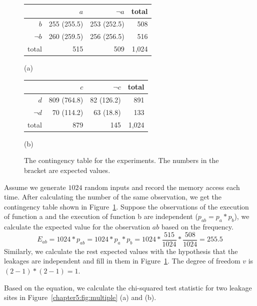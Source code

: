 \begin{figure}[h]
  \begin{minipage}{0.45\linewidth}
      \begin{tabular}{rrrr}
        \toprule
        & $a$ & $\lnot a$  & total\\
        \midrule
        $b$   & 255 (255.5) & 253 (252.5) &   508  \\
        $\lnot b$   & 260 (259.5)  & 256 (256.5) &    516   \\
        total &   515 &  509   & 1,024   \\
        \bottomrule
      \end{tabular}\caption*{(a)}
  \end{minipage}
\hfill
  \begin{minipage}{0.45\linewidth}
      \begin{tabular}{rrrr}
        \toprule
        & $c$ & $\lnot c$  & total\\
        \midrule
        $d$   & 809 (764.8) & 82 (126.2) & 891    \\
        $\lnot d$   & 70 (114.2)  & 63 (18.8)&  133     \\
        total &  879 &  145  & 1,024    \\
        \bottomrule
      \end{tabular}\caption*{(b)}
  \end{minipage}
  \caption{The contingency table for the experiments. The numbers in the bracket are expected values. }\label{chapter5:fig:con_table}
\end{figure}


Assume we generate $1024$ random inputs and record the memory access each time.  After calculating the number of the same observation, we get the contingency table shown in Figure~\ref{chapter5:fig:con_table}. Suppose the observations of the execution of function \textsf{a} and the execution of function \textsf{b} are independent ($p_{ab} = p_a*p_b$),  we calculate the expected value for the observation $ab$ based on the frequency.
\[ E_{ab} = 1024*p_{ab} = 1024*p_a*p_b = 1024*\frac{515}{1024}*\frac{508}{1024} = 255.5\]
Similarly, we calculate the rest expected values with the hypothesis that the leakages are independent and fill in them in Figure~\ref{chapter5:fig:con_table}. The degree of freedom $v$ is $(2-1)*(2-1) = 1$.

Based on the equation, we calculate the chi-squared test statistic for two leakage sites in Figure~\ref{chapter5:fig:multiple} (a) and (b).

